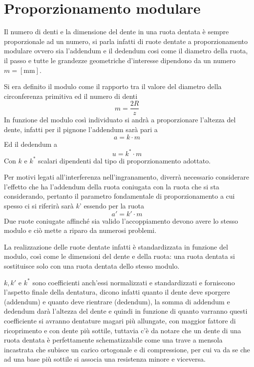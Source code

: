\documentclass[a4paper, 15pt]{article}
\begin{document}
\section{Proporzionamento modulare}		
\begin{adjustwidth}{2in}{}			
		Il numero di denti e la dimensione del dente in una ruota dentata è sempre proporzionale ad un numero, si parla infatti di ruote dentate a proporzionamento modulare ovvero sia l'addendum e il dedendum cosi come il diametro della ruota, il passo e tutte le grandezze geometriche d'interesse dipendono da un numero $m = [\si{\milli\meter}]$. \newline 
		
		Si era definito il modulo come il rapporto tra il valore del diametro della circonferenza primitiva ed il numero di denti
		\[m = \dfrac{2R}{z}\]		
		In funzione del modulo così individuato si andrà a proporzionare l'altezza del dente, infatti per il pignone l'addendum sarà pari a 
		\[a = k \cdot m\] 
		Ed il dedendum a
		\[u = k^* \cdot m\]
		Con $k$ e $k^*$  scalari dipendenti dal tipo di proporzionamento adottato. \newline 
		
		Per motivi legati all’interferenza nell’ingranamento, diverrà necessario considerare l’effetto che ha l’addendum della ruota coniugata con la ruota che si sta considerando, pertanto il parametro fondamentale di
		proporzionamento a cui spesso ci si riferirà sarà $k’$ essendo per la ruota
		\[a' = k' \cdot m\]
\newpage				
		Due ruote coniugate affinché sia valido l'accoppiamento devono avere lo stesso modulo e ciò mette a riparo da numerosi problemi. 
		
		La realizzazione delle ruote dentate infatti è standardizzata in funzione del modulo, così come le dimensioni del dente e della ruota: una ruota dentata si sostituisce solo con una ruota dentata dello stesso modulo. \newline
				
		$k, k'$ e $k^*$ sono coefficienti anch'essi normalizzati e standardizzati e forniscono l'aspetto finale della dentatura, dicono infatti quanto il dente deve sporgere (addendum) e quanto deve rientrare (dedendum), la somma di addendum e dedendum darà l'altezza del dente e quindi in funzione di quanto varranno questi coefficiente si avranno dentature magari più allungate, con maggior fattore di ricoprimento e con dente più sottile, tuttavia c'è da notare che un dente di una ruota dentata è perfettamente schematizzabile come una trave a mensola incastrata che subisce un carico ortogonale e di compressione, per cui va da se che ad una base più sottile si associa una resistenza minore e viceversa.
		

\end{adjustwidth}
\end{document}

